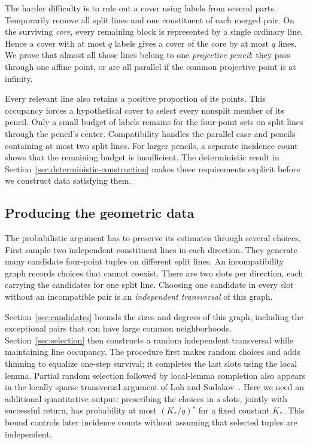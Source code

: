 \documentclass[11pt]{article}
\theoremstyle{definition}
\theoremstyle{remark}
\begin{document}
The harder difficulty is to rule out a cover using labels from several
parts. Temporarily remove all split lines and one constituent of each
merged pair. On the surviving \emph{core}, every remaining block is
represented by a single ordinary line. Hence a cover with at most $q$
labels gives a cover of the core by at most $q$ lines. We prove that
almost all those lines belong to one \emph{projective pencil}: they pass
through one affine point, or are all parallel if the common projective
point is at infinity.

Every relevant line also retains a positive proportion of its points.
This occupancy forces a hypothetical cover to select every nonsplit
member of its pencil. Only a small budget of labels remains for the
four-point sets on split lines through the pencil's center. Compatibility
handles the parallel case and pencils containing at most two split
lines. For larger pencils, a separate incidence count shows that the
remaining budget is insufficient. The deterministic result in
Section~\ref{sec:deterministic-construction} makes these requirements
explicit before we construct data satisfying them.

\subsection{Producing the geometric data}

The probabilistic argument has to preserve its estimates through several
choices. First sample two independent constituent lines in each
direction. They generate many candidate four-point tuples on different
split lines. An incompatibility graph records choices that cannot coexist.
There are two slots per direction, each carrying the candidates for one
split line. Choosing one candidate in every slot without an incompatible
pair is an \emph{independent transversal} of this graph.

Section~\ref{sec:candidates} bounds the sizes and degrees of this graph,
including the exceptional pairs that can have large common neighborhoods.
Section~\ref{sec:selection} then constructs a random independent
transversal while maintaining line occupancy. The procedure first makes
random choices and adds thinning to equalize one-step survival; it completes
the last slots using the local lemma. Partial random selection followed
by local-lemma completion also appears in the locally sparse transversal
argument of Loh and Sudakov~\cite[Section~4]{LohSudakov2007}.
Here we need an additional quantitative output: prescribing the choices
in $s$ slots, jointly with successful return, has probability at most
$(K_*/q)^s$ for a fixed constant $K_*$. This bound controls later
incidence counts without assuming that selected tuples are independent.
\end{document}
